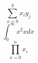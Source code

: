 \documentclass{article}
\begin{document}
\begin{huge}

\[\sum_{x=0}^{y} x_i y_j\]
\[\int_{0}^{\infty} x^2 x dx\]
\[\prod_{x=0}^{n} x_{i}\]

\end{huge}
\end{document}
